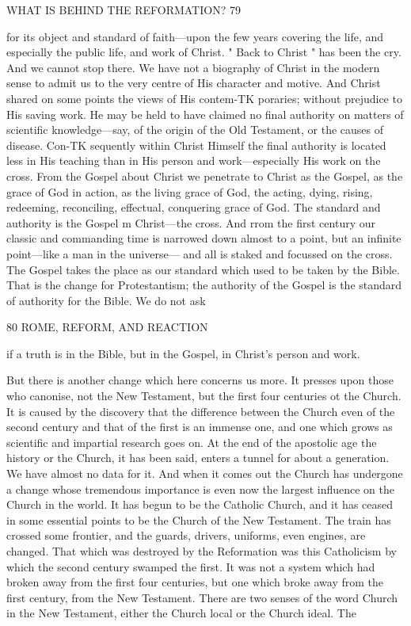 \documentclass[12pt,a5paper,oneside]{book}
\begin{document}
WHAT IS BEHIND THE REFORMATION? 79 

for its object and standard of faith---upon the few years 
covering the life, and especially the public life, and 
work of Christ. " Back to Christ " has been the cry. 
And we cannot stop there. We have not a biography 
of Christ in the modern sense to admit us to the 
very centre of His character and motive. And Christ 
shared on some points the views of His contem-TK
poraries; without prejudice to His saving work. He 
may be held to have claimed no final authority on 
matters of scientific knowledge---say, of the origin of 
the Old Testament, or the causes of disease. Con-TK
sequently within Christ Himself the final authority 
is located less in His teaching than in His person and 
work---especially His work on the cross. From the 
Gospel about Christ we penetrate to Christ as the 
Gospel, as the grace of God in action, as the living 
grace of God, the acting, dying, rising, redeeming, 
reconciling, effectual, conquering grace of God. The 
standard and authority is the Gospel m Christ---the 
cross. And rrom the first century our classic and 
commanding time is narrowed down almost to a point, 
but an infinite point---like a man in the universe---
and all is staked and focussed on the cross. The 
Gospel takes the place as our standard which used 
to be taken by the Bible. That is the change for 
Protestantism; the authority of the Gospel is the 
standard of authority for the Bible. We do not ask 



80 ROME, REFORM, AND REACTION 

if a truth is in the Bible, but in the Gospel, in 
Christ's person and work. 

But there is another change which here concerns 
us more. It presses upon those who canonise, not the 
New Testament, but the first four centuries ot the 
Church. It is caused by the discovery that the 
difference between the Church even of the second 
century and that of the first is an immense one, and 
one which grows as scientific and impartial research 
goes on. At the end of the apostolic age the history or 
the Church, it has been said, enters a tunnel for about 
a generation. We have almost no data for it. And 
when it comes out the Church has undergone a 
change whose tremendous importance is even now 
the largest influence on the Church in the world. It 
has begun to be the Catholic Church, and it has 
ceased in some essential points to be the Church of 
the New Testament. The train has crossed some 
frontier, and the guards, drivers, uniforms, even 
engines, are changed. That which was destroyed by 
the Reformation was this Catholicism by which the 
second century swamped the first. It was not a 
system which had broken away from the first four 
centuries, but one which broke away from the first 
century, from the New Testament. There are two 
senses of the word Church in the New Testament, 
either the Church local or the Church ideal. The 
\end{document}
